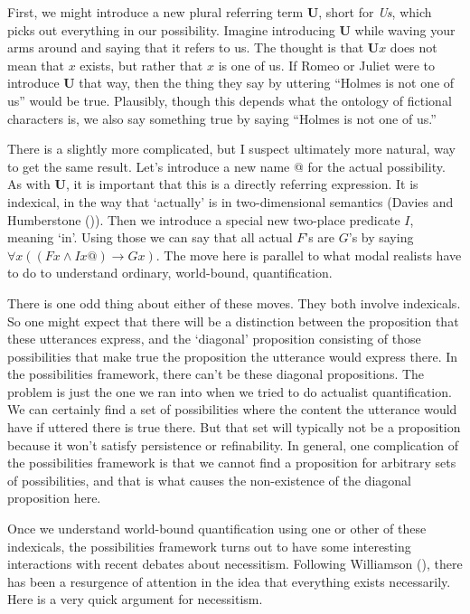 \documentclass[
  11pt,
  letterpaper,
  DIV=11,
  numbers=noendperiod,
  twoside]{scrartcl}
\begin{document}
First, we might introduce a new plural referring term \(\mathbf{U}\),
short for \emph{Us}, which picks out everything in our possibility.
Imagine introducing \(\mathbf{U}\) while waving your arms around and
saying that it refers to us. The thought is that \(\mathbf{U}x\) does
not mean that \(x\) exists, but rather that \(x\) is one of us. If Romeo
or Juliet were to introduce \(\mathbf{U}\) that way, then the thing they
say by uttering ``Holmes is not one of us'' would be true. Plausibly,
though this depends what the ontology of fictional characters is, we
also say something true by saying ``Holmes is not one of us.''

There is a slightly more complicated, but I suspect ultimately more
natural, way to get the same result. Let's introduce a new name @ for
the actual possibility. As with \(\mathbf{U}\), it is important that
this is a directly referring expression. It is indexical, in the way
that `actually' is in two-dimensional semantics (Davies and Humberstone
()). Then we introduce a special new
two-place predicate \(I\), meaning `in'. Using those we can say that all
actual \(F\)'s are \(G\)'s by saying
\(\forall x((Fx \wedge Ix@) \rightarrow Gx)\). The move here is parallel
to what modal realists have to do to understand ordinary, world-bound,
quantification.

There is one odd thing about either of these moves. They both involve
indexicals. So one might expect that there will be a distinction between
the proposition that these utterances express, and the `diagonal'
proposition consisting of those possibilities that make true the
proposition the utterance would express there. In the possibilities
framework, there can't be these diagonal propositions. The problem is
just the one we ran into when we tried to do actualist quantification.
We can certainly find a set of possibilities where the content the
utterance would have if uttered there is true there. But that set will
typically not be a proposition because it won't satisfy persistence or
refinability. In general, one complication of the possibilities
framework is that we cannot find a proposition for arbitrary sets of
possibilities, and that is what causes the non-existence of the diagonal
proposition here.

Once we understand world-bound quantification using one or other of
these indexicals, the possibilities framework turns out to have some
interesting interactions with recent debates about necessitism.
Following Williamson (), there
has been a resurgence of attention in the idea that everything exists
necessarily. Here is a very quick argument for necessitism.
\end{document}
